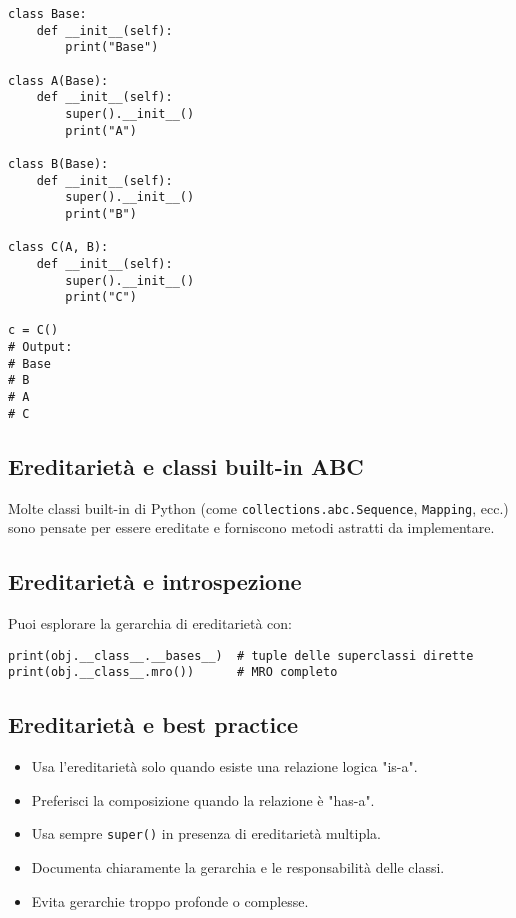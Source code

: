 \documentclass[a4paper,12pt]{article}
\begin{document}
\begin{lstlisting}
class Base:
    def __init__(self):
        print("Base")

class A(Base):
    def __init__(self):
        super().__init__()
        print("A")

class B(Base):
    def __init__(self):
        super().__init__()
        print("B")

class C(A, B):
    def __init__(self):
        super().__init__()
        print("C")

c = C()
# Output:
# Base
# B
# A
# C
\end{lstlisting}

\subsection*{Ereditarietà e classi built-in ABC}
Molte classi built-in di Python (come \texttt{collections.abc.Sequence}, \texttt{Mapping}, ecc.) sono pensate per essere ereditate e forniscono metodi astratti da implementare.

\subsection*{Ereditarietà e introspezione}
Puoi esplorare la gerarchia di ereditarietà con:
\begin{lstlisting}
print(obj.__class__.__bases__)  # tuple delle superclassi dirette
print(obj.__class__.mro())      # MRO completo
\end{lstlisting}

\subsection*{Ereditarietà e best practice}
\begin{itemize}
    \item Usa l'ereditarietà solo quando esiste una relazione logica "is-a".
    \item Preferisci la composizione quando la relazione è "has-a".
    \item Usa sempre \texttt{super()} in presenza di ereditarietà multipla.
    \item Documenta chiaramente la gerarchia e le responsabilità delle classi.
    \item Evita gerarchie troppo profonde o complesse.
\end{itemize}
\end{document}
